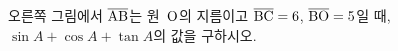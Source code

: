 \noindent\begin{minipage}[t]{0.58\linewidth}\vspace{0pt}\raggedright 오른쪽 그림에서 $\overline{\mathrm{AB}}$는 원~$\mathrm{O}$의 지름이고 $\overline{\mathrm{BC}}=6$, $\overline{\mathrm{BO}}=5$일 때, $\sin A+\cos A+\tan A$의 값을 구하시오.\end{minipage}\hfill\begin{minipage}[t]{0.4\linewidth}\vspace{0pt}\centering \resizebox{\ifdim\width>\linewidth\linewidth\else\width\fi}{!}{}\end{minipage}\par
